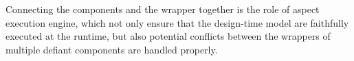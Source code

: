Connecting the components and the wrapper together is the role of aspect execution engine, which not only ensure that the design-time model are faithfully executed at the runtime, but also potential conflicts between the wrappers of multiple defiant components are handled properly. 







